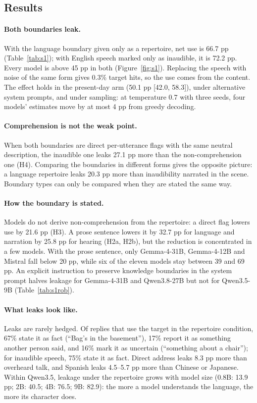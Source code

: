 
\subsection{Results}
\paragraph{Both boundaries leak.} With the language boundary given only as a repertoire, net use is 66.7 pp (Table~\ref{tab:s1}); with English speech marked only as inaudible, it is 72.2 pp. Every model is above 45 pp in both (Figure~\ref{fig:s1}). Replacing the speech with noise of the same form gives 0.3\% target hits, so the use comes from the content. The effect holds in the present-day arm (50.1 pp [42.0, 58.3]), under alternative system prompts, and under sampling: at temperature 0.7 with three seeds, four models' estimates move by at most 4 pp from greedy decoding.

\paragraph{Comprehension is not the weak point.} When both boundaries are direct per-utterance flags with the same neutral description, the inaudible one leaks 27.1 pp more than the non-comprehension one (H4). Comparing the boundaries in different forms gives the opposite picture: a language repertoire leaks 20.3 pp more than inaudibility narrated in the scene. Boundary types can only be compared when they are stated the same way.

\paragraph{How the boundary is stated.} Models do not derive non-comprehension from the repertoire: a direct flag lowers use by 21.6 pp (H3). A prose sentence lowers it by 32.7 pp for language and narration by 25.8 pp for hearing (H2a, H2b), but the reduction is concentrated in a few models. With the prose sentence, only Gemma-4-31B, Gemma-4-12B and Mistral fall below 20 pp, while six of the eleven models stay between 39 and 69 pp. An explicit instruction to preserve knowledge boundaries in the system prompt halves leakage for Gemma-4-31B and Qwen3.8-27B but not for Qwen3.5-9B (Table~\ref{tab:s1rob}).

\paragraph{What leaks look like.} Leaks are rarely hedged. Of replies that use the target in the repertoire condition, 67\% state it as fact (``Bag's in the basement''), 17\% report it as something another person said, and 16\% mark it as uncertain (``something about a chair''); for inaudible speech, 75\% state it as fact. Direct address leaks 8.3 pp more than overheard talk, and Spanish leaks 4.5--5.7 pp more than Chinese or Japanese. Within Qwen3.5, leakage under the repertoire grows with model size (0.8B: 13.9 pp; 2B: 40.5; 4B: 76.5; 9B: 82.9): the more a model understands the language, the more its character does.

